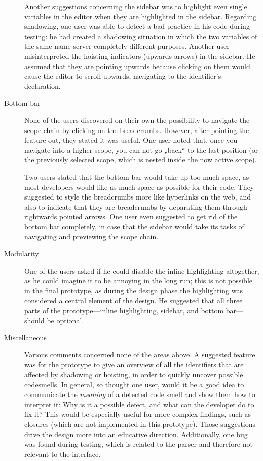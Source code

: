 \begin{description}
Another suggestions concerning the sidebar was to highlight even single
variables in the editor when they are highlighted in the sidebar.
Regarding shadowing, one user was able to detect a bad practice in his
code during testing: he had created a shadowing situation in which the
two variables of the same name server completely different purposes.
Another user misinterpreted the hoisting indicators (upwards arrows) in
the sidebar. He assumed that they are pointing upwards because clicking
on them would cause the editor to scroll upwards, navigating to the
identifier’s declaration.
\item[Bottom bar]
None of the users discovered on their own the possibility to navigate
the scope chain by clicking on the breadcrumbs. However, after pointing
the feature out, they stated it was useful. One user noted that, once
you navigate into a higher scope, you can not go „back“ to the last
position (or the previously selected scope, which is nested inside the
now active scope).

Two users stated that the bottom bar would take up too much space, as
most developers would like as much space as possible for their code.
They suggested to style the breadcrumbs more like hyperlinks on the web,
and also to indicate that they are breadcrumbs by deparating them
through rightwards pointed arrows. One user even suggested to get rid of
the bottom bar completely, in case that the sidebar would take its tasks
of navigating and previewing the scope chain.
\item[Modularity]
One of the users asked if he could disable the inline highlighting
altogether, as he could imagine it to be annoying in the long run; this
is not possible in the final prototype, as during the design phase the
highlighting was considered a central element of the design. He
suggested that all three parts of the prototype—inline highlighting,
sidebar, and bottom bar—should be optional.
\item[Miscellaneous]
Various comments concerned none of the areas above. A suggested feature
was for the prototype to give an overview of all the identifiers that
are affected by shadowing or hoisting, in order to quickly uncover
possible \glspl{codesmell}. In general, so thought one user, would it be
a good idea to communicate the \emph{meaning} of a detected code smell
and show them how to interpret it: Why is it a possible defect, and what
can the developer do to fix it? This would be especially useful for more
complex findings, such as closures (which are not implemented in this
prototype). Those suggestions drive the design more into an educative
direction. Additionally, one bug was found during testing, which is
related to the parser and therefore not relevant to the interface.
\end{description}

